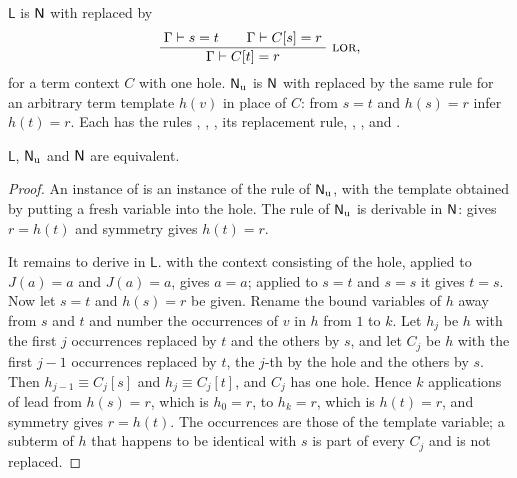 \begin{definition}
\label{kern:def:L}
$\mathsf{L}$ is $\mathsf{N}$ with  replaced by
\[
 \infrule{\Gamma\proves s=t\qquad\Gamma\proves C[s]=r}
         {\Gamma\proves C[t]=r}\ \rulename{LOR},
\]
for a term context $C$ with one hole.  $\mathsf{N}_{\mathrm{u}}$ is $\mathsf{N}$ with
 replaced by the same rule for an arbitrary term template
$h(v)$ in place of $C$: from $s=t$ and $h(s)=r$ infer $h(t)=r$.  Each has
the rules , , , its replacement
rule, , ,  and .
\end{definition}

\begin{theorem}
\label{kern:thm:onehole}
$\mathsf{L}$, $\mathsf{N}_{\mathrm{u}}$ and $\mathsf{N}$ are equivalent.
\end{theorem}

\begin{proof}
An instance of  is an instance of the rule of
$\mathsf{N}_{\mathrm{u}}$, with the template obtained by putting a fresh variable
into the hole.  The rule of $\mathsf{N}_{\mathrm{u}}$ is derivable in $\mathsf{N}$:
 gives $r=h(t)$ and symmetry gives $h(t)=r$.

It remains to derive  in $\mathsf{L}$.   with the
context consisting of the hole, applied to $J(a)=a$ and $J(a)=a$, gives
$a=a$; applied to $s=t$ and $s=s$ it gives $t=s$.  Now let $s=t$ and
$h(s)=r$ be given.  Rename the bound variables of $h$ away from $s$ and $t$
and number the occurrences of $v$ in $h$ from $1$ to $k$.  Let $h_j$ be $h$
with the first $j$ occurrences replaced by $t$ and the others by $s$, and
let $C_j$ be $h$ with the first $j-1$ occurrences replaced by $t$, the
$j$-th by the hole and the others by $s$.  Then $h_{j-1}\equiv C_j[s]$ and
$h_j\equiv C_j[t]$, and $C_j$ has one hole.  Hence $k$ applications of
 lead from $h(s)=r$, which is $h_0=r$, to $h_k=r$, which is
$h(t)=r$, and symmetry gives $r=h(t)$.  The occurrences are those of the
template variable; a subterm of $h$ that happens to be identical with $s$ is
part of every $C_j$ and is not replaced.
\end{proof}

